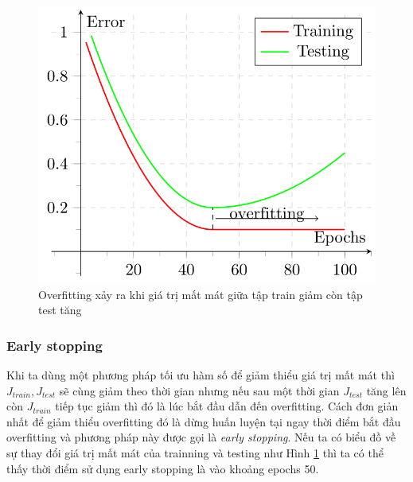 \begin{center}
 	\begin{figure}[H]
    \begin{center}
    \includegraphics[scale=0.5]{chap3/image/overfittingError.png}
    \end{center}
    \caption{Overfitting xảy ra khi giá trị mất mát giữa tập train giảm còn tập test tăng}
    \label{fig:overfittingError}
    \end{figure}
\end{center}

\subsubsection{Early stopping}
\hspace{5mm} Khi ta dùng một phương pháp tối ưu hàm số để giảm thiểu giá trị mất mát thì \textit{$J_{train}, J_{test}$} sẽ cùng giảm theo thời gian nhưng nếu sau một thời gian \textit{$J_{test}$} tăng lên còn \textit{$J_{train}$} tiếp tục giảm thì đó là lúc bắt đầu dẫn đến overfitting. Cách đơn giản nhất để giảm thiểu overfitting đó là dừng huấn luyện tại ngay thời điểm bắt đầu overfitting và phương pháp này được gọi là \textit{early stopping}. Nếu ta có biểu đồ về sự thay đổi giá trị mất mát của trainning và testing như Hình \ref{fig:overfittingError} thì ta có thể thấy thời điểm sử dụng early stopping là vào khoảng epochs 50.

